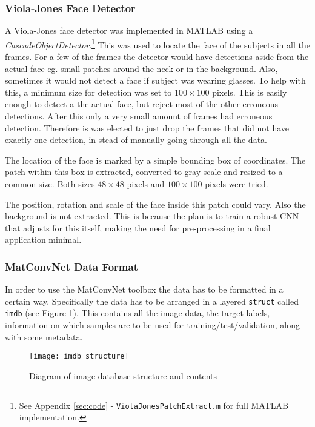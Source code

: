\documentclass[Main]{subfiles}
\begin{document}
			\subsubsection{Viola-Jones Face Detector} %
				\label{ssub:viola_jones_face_detector}
				A Viola-Jones face detector was implemented in MATLAB using a \emph{CascadeObjectDetector}.\footnote{See Appendix \ref{sec:code} - \texttt{ViolaJonesPatchExtract.m} for full MATLAB implementation.}
				This was used to locate the face of the subjects in all the frames.
				For a few of the frames the detector would have detections aside from the actual face eg. small patches around the neck or in the background.
				Also, sometimes it would not detect a face if subject was wearing glasses.
				To help with this, a minimum size for detection was set to $100\times100$ pixels.
				This is easily enough to detect a the actual face, but reject most of the other erroneous detections.
				After this only a very small amount of frames had erroneous detection.
				Therefore is was elected to just drop the frames that did not have exactly one detection, in stead of manually going through all the data.

				The location of the face is marked by a simple bounding box of coordinates.
				The patch within this box is extracted, converted to gray scale and resized to a common size.
				Both sizes $48\times48$ pixels and $100\times100$ pixels were tried.

				The position, rotation and scale of the face inside this patch could vary.
				Also the background is not extracted.
				This is because the plan is to train a robust CNN that adjusts for this itself, making the need for pre-processing in a final application minimal.


			\subsubsection{MatConvNet Data Format} %
				\label{ssub:matconvnet_data_format}
				In order to use the MatConvNet toolbox the data has to be formatted in a certain way.
				Specifically the data has to be arranged in a layered \texttt{struct} called \texttt{imdb} (see Figure \ref{fig:imdb_struct}).
				This contains all the image data, the target labels, information on which samples are to be used for training/test/validation, along with some metadata.
				\begin{figure}[th]
					\begin{center}
						\texttt{[image: imdb\_structure]}
					\end{center}
					\caption{Diagram of image database structure and contents}
					\label{fig:imdb_struct}
				\end{figure}
				
\end{document}
